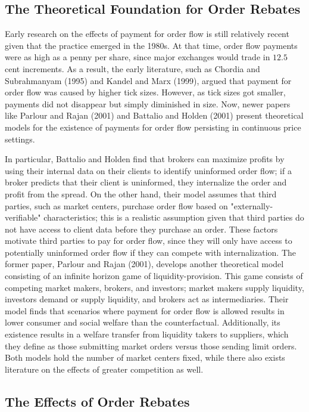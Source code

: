 \documentclass[12pt,a4paper]{article}
\begin{document}
	\subsection{The Theoretical Foundation for Order Rebates}
	
		Early research on the effects of payment for order flow is still relatively recent given that the practice emerged in the 1980s. At that time, order flow payments were as high as a penny per share, since major exchanges would trade in $12.5$ cent increments. As a result, the early literature, such as Chordia and Subrahmanyam (1995) and Kandel and Marx (1999), argued that payment for order flow was caused by higher tick sizes. However, as tick sizes got smaller, payments did not disappear but simply diminished in size. Now, newer papers like Parlour and Rajan (2001) and Battalio and Holden (2001) present theoretical models for the existence of payments for order flow persisting in continuous price settings. 
		
		In particular, Battalio and Holden find that brokers can maximize profits by using their internal data on their clients to identify uninformed order flow; if a broker predicts that their client is uninformed, they internalize the order and profit from the spread. On the other hand, their model assumes that third parties, such as market centers, purchase order flow based on "externally-verifiable" characteristics; this is a realistic assumption given that third parties do not have access to client data before they purchase an order. These factors motivate third parties to pay for order flow, since they will only have access to potentially uninformed order flow if they can compete with internalization. The former paper, Parlour and Rajan (2001), develops another theoretical model consisting of an infinite horizon game of liquidity-provision. This game consists of competing market makers, brokers, and investors; market makers supply liquidity, investors demand or supply liquidity, and brokers act as intermediaries. Their model finds that scenarios where payment for order flow is allowed results in lower consumer and social welfare than the counterfactual. Additionally, its existence results in a welfare transfer from liquidity takers to suppliers, which they define as those submitting market orders versus those sending limit orders. Both models hold the number of market centers fixed, while there also exists literature on the effects of greater competition as well. 
	
	\subsection{The Effects of Order Rebates}
	
\end{document}
